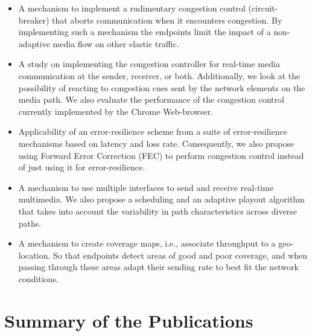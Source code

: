 \begin{itemize}
\setlength{\itemsep}{0pt}


\item A mechanism to implement a rudimentary congestion control (circuit-
breaker) that aborts communication when it encounters congestion. By
implementing such a mechanism the endpoints limit the impact of a non-adaptive
media flow on other elastic traffic.

\item A study on implementing the congestion controller for real-time media
communication at the sender, receiver, or both. Additionally, we look at the
possibility of reacting to congestion cues sent by the network elements on the
media path. We also evaluate the performance of the congestion control
currently implemented by the Chrome Web-browser.

\item Applicability of an error-resilience scheme from a suite of
error-resilience mechanisms based on latency and loss rate. Consequently, we
also propose using Forward Error Correction (FEC) to perform congestion
control instead of just using it for error-resilience.

\item A mechanism to use multiple interfaces to send and receive real-time
multimedia. We also propose a scheduling and an adaptive playout algorithm
that takes into account the variability in path characteristics across diverse
paths.

\item A mechanism to create coverage maps, i.e., associate throughput to a
geo-location. So that endpoints detect areas of good and poor coverage, and
when passing through these areas adapt their sending rate to best fit the
network conditions.

\end{itemize}

\section{Summary of the Publications}

